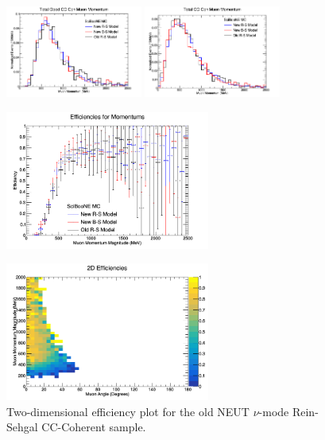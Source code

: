 \documentclass[11pt]{article}
\begin{document}
\begin{figure}[H]
\centering
\includegraphics[width=0.4\textwidth]{NMCombinedPlotsImages/15-NMCombinedPlots.png}
\includegraphics[width=0.4\textwidth]{NMCombinedPlotsImages/17-NMCombinedPlots.png}
\caption{}
\end{figure}

\begin{figure}[H]
\centering
\includegraphics[width=0.6\textwidth]{NMCombinedPlotsImages/25-NMCombinedPlots.png}
\caption{}
\end{figure}

\begin{figure}[H]
\centering
\includegraphics[width=0.6\textwidth]{CCCohPlots/2DEffNMRS.png}
\caption{Two-dimensional efficiency plot for the old NEUT $\nu$-mode Rein-Sehgal CC-Coherent sample.}
\end{figure}
\end{document}
